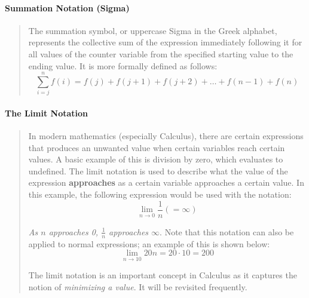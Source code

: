 \documentclass[letterpaper,12pt,twoside]{report}
\begin{document}
	\paragraph{Summation Notation (Sigma)}
	\begin{quotation}
		The summation symbol, or uppercase Sigma in the Greek alphabet, represents the collective sum of the expression immediately following it for all values of the counter variable from the specified starting value to the ending value. It is more formally defined as follows: $$\sum^n_{i=j}f(i)=f(j)+f(j+1)+f(j+2)+\dots+f(n-1)+f(n)$$
		
		
	\end{quotation}
	\paragraph{The Limit Notation}
	\begin{quotation}
		In modern mathematics (especially Calculus), there are certain expressions that produces an unwanted value when certain variables reach certain values. A basic example of this is division by zero, which evaluates to undefined. The limit notation is used to describe what the value of the expression \textbf{approaches} as a certain variable approaches a certain value. In this example, the following expression would be used with the notation: $$\lim_{n\to 0} \frac{1}{n}(=\infty)$$
		
		\textit{As $n$ approaches 0, $\frac{1}{n}$ approaches $\infty$}. Note that this notation can also be applied to normal expressions; an example of this is shown below: $$\lim_{n \to 10} 20n=20\cdot10=200$$
		
		The limit notation is an important concept in Calculus as it captures the notion of \textit{minimizing a value}. It will be revisited frequently.
	\end{quotation}
	
\end{document}
